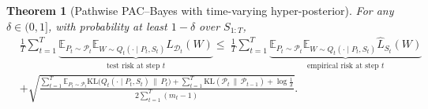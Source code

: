 \documentclass[10pt]{article} %
\newtheorem{theorem}{Theorem}
\begin{document}
\begin{theorem}[Pathwise PAC--Bayes with time-varying hyper-posterior]
\label{the: full}
For any $\delta\in(0,1]$, with probability at least $1-\delta$ over $S_{1:T}$,
\begin{equation}
\begin{aligned} 
& \frac{1}{T} \sum_{t=1}^T \underbrace{\mathbb{E}_{P_t \sim \mathcal{P}_t} \mathbb{E}_{W \sim Q_t(\cdot \mid P_t, S_t)} L_{\mathcal{D}_t}(W)}_{\text{test risk at step } t} 
\le \ \frac{1}{T} \sum_{t=1}^T \underbrace{\mathbb{E}_{P_t \sim \mathcal{P}_t} \mathbb{E}_{W \sim Q_t(\cdot \mid P_t, S_t)} \hat{L}_{S_t}(W)}_{\text{empirical risk at step } t} \\ 
& + \sqrt{\frac{ \sum_{t=1}^T \mathbb{E}_{P_t \sim \mathcal{P}_t} \mathrm{KL}\big(Q_t(\cdot \mid P_t, S_t) \,\|\, P_t\big) + \sum_{t=1}^T \mathrm{KL}(\mathcal{P}_t \,\|\, \mathcal{P}_{t-1}) + \log\frac{1}{\delta} }{2 \sum_{t=1}^T (m_t - 1)}}. 
\end{aligned} 
\end{equation}
\end{theorem}
\end{document}
